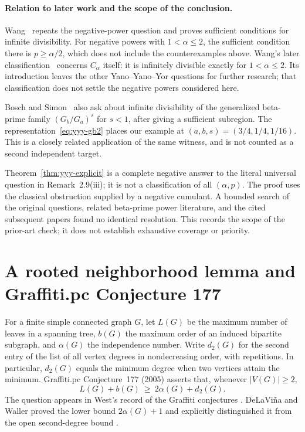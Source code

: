 \documentclass[11pt,a4paper]{article}
\theoremstyle{definition}
\theoremstyle{remark}
\numberwithin{equation}{section}
\begin{document}
\paragraph{Relation to later work and the scope of the conclusion.}
Wang~\cite[Section~1.3]{Wang2024} repeats the negative-power question
and proves sufficient conditions for infinite divisibility. For negative
powers with $1<\alpha\le2$, the sufficient condition there is
$p\ge\alpha/2$, which does not include the counterexamples above.
Wang's later classification~\cite{Wang2026} concerns $C_\alpha$ itself:
it is infinitely divisible exactly for $1<\alpha\le2$. Its introduction
leaves the other Yano--Yano--Yor questions for further research; that
classification does not settle the negative powers considered here.

Bosch and Simon~\cite[final paragraph]{BoschSimon2015} also ask about
infinite divisibility of the generalized beta-prime family
$(G_b/G_a)^s$ for $s<1$, after giving a sufficient subregion.
The representation~\eqref{eq:yyy-gb2} places our example at
$(a,b,s)=(3/4,1/4,1/16)$. This is a closely related application of the
same witness, and is not counted as a second independent target.

Theorem~\ref{thm:yyy-explicit} is a complete negative answer to the
literal universal question in Remark~2.9(iii); it is not a classification
of all $(\alpha,p)$. The proof uses the classical obstruction supplied
by a negative cumulant. A bounded search of the original questions,
related beta-prime power literature, and the cited subsequent papers
found no identical resolution. This records the scope of the prior-art
check; it does not establish exhaustive coverage or priority.


\section{A rooted neighborhood lemma and Graffiti.pc Conjecture 177}
\label{sec:wow177}

For a finite simple connected graph $G$, let $L(G)$ be the maximum
number of leaves in a spanning tree, $b(G)$ the maximum order of an
induced bipartite subgraph, and $\alpha(G)$ the independence number.
Write $d_2(G)$ for the second entry of the list of all vertex degrees
in nondecreasing order, with repetitions. In particular, $d_2(G)$
equals the minimum degree when two vertices attain the minimum.
Graffiti.pc Conjecture~177 (2005) asserts that, whenever $|V(G)|\ge2$,
\begin{equation}\label{wow:target}
 L(G)+b(G)\ \ge\ 2\alpha(G)+d_2(G).
\end{equation}
The question appears in West's record of the Graffiti conjectures
\cite{wow:West}. DeLaVi\~na and Waller proved the lower bound
$2\alpha(G)+1$ and explicitly distinguished it from the open
second-degree bound \cite[Theorem~3 and the paragraph following it]{wow:DW}.
\end{document}
